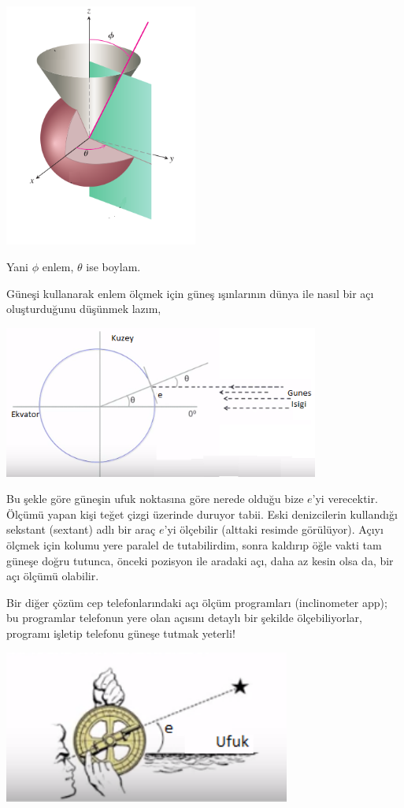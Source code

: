 \documentclass[12pt,fleqn]{article}\usepackage{../../common}
\begin{document}
\includegraphics[height=8cm]{geo_03.png}

Yani $\phi$ enlem, $\theta$ ise boylam.

Güneşi kullanarak enlem ölçmek için güneş ışınlarının dünya ile nasıl bir açı
oluşturduğunu düşünmek lazım,

\includegraphics[height=5cm]{geo_05.png}

Bu şekle göre güneşin ufuk noktasına göre nerede olduğu bize $e$'yi
verecektir. Ölçümü yapan kişi teğet çizgi üzerinde duruyor tabii. Eski
denizcilerin kullandığı sekstant (sextant) adlı bir araç $e$'yi ölçebilir
(alttaki resimde görülüyor). Açıyı ölçmek için kolumu yere paralel de
tutabilirdim, sonra kaldırıp öğle vakti tam güneşe doğru tutunca, önceki
pozisyon ile aradaki açı, daha az kesin olsa da, bir açı ölçümü olabilir.

Bir diğer çözüm cep telefonlarındaki açı ölçüm programları (inclinometer app);
bu programlar telefonun yere olan açısını detaylı bir şekilde ölçebiliyorlar,
programı işletip telefonu güneşe tutmak yeterli!

\includegraphics[height=5cm]{geo_01.png}
\end{document}
